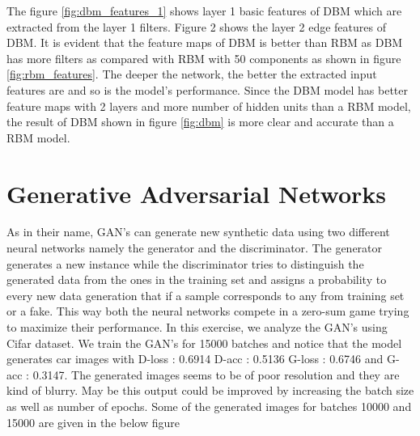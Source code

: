 The figure \ref{fig:dbm_features_1} shows layer 1 basic features of DBM which are extracted from the layer 1 filters. Figure 2 shows the layer 2 edge features of DBM. It is evident that the feature maps of DBM is better than RBM as DBM has more filters as compared with RBM with 50 components as shown in figure \ref{fig:rbm_features}. The deeper the network, the better the extracted input features are and so is the model's performance. Since the DBM model has better feature maps with 2 layers and more number of hidden units than a RBM model, the result of DBM shown in figure \ref{fig:dbm} is more clear and accurate than a RBM model.\\
\section{Generative Adversarial Networks}
As in their name, GAN's can generate new synthetic data using two different neural networks namely the generator and the discriminator. The generator generates a new instance while the discriminator tries to distinguish the generated data from the ones in the training set and assigns a probability to every new data generation that if a sample corresponds to any from training set or a fake. This way both the neural networks compete in a zero-sum game trying to maximize their performance.  In this exercise, we analyze the GAN's using Cifar dataset. We train the GAN's for 15000 batches and notice that the model generates car images with  D-loss : 0.6914 D-acc : 0.5136 G-loss : 0.6746 and G-acc : 0.3147. The generated images seems to be of poor resolution and they are kind of blurry. May be this output could be improved by increasing the batch size as well as number of epochs. Some of the generated images for batches 10000 and 15000 are given in the below figure 
